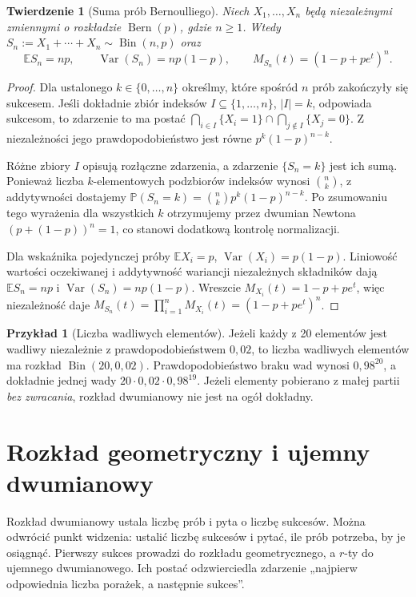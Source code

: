 \documentclass[11pt,a4paper,oneside]{report}
\numberwithin{equation}{chapter}
\theoremstyle{plain}
\newtheorem{twierdzenie}{Twierdzenie}[chapter]
\theoremstyle{definition}
\newtheorem{przyklad}{Przykład}[chapter]
\theoremstyle{remark}
\newcommand{\Prob}{\mathbb{P}}
\newcommand{\E}{\mathbb{E}}
\newcommand{\Var}{\operatorname{Var}}
\newcommand{\Bin}{\operatorname{Bin}}
\begin{document}
\begin{twierdzenie}[Suma prób Bernoulliego]
Niech $X_1,\ldots,X_n$ będą niezależnymi zmiennymi o rozkładzie
$\operatorname{Bern}(p)$, gdzie $n\geq1$. Wtedy
$S_n:=X_1+\cdots+X_n\sim\Bin(n,p)$ oraz
\[
\E S_n=np,\qquad \Var(S_n)=np(1-p),\qquad
M_{S_n}(t)=(1-p+pe^t)^n.
\]
\end{twierdzenie}
\begin{proof}
Dla ustalonego $k\in\{0,\ldots,n\}$ określmy,
które spośród $n$ prób zakończyły się sukcesem.
Jeśli dokładnie zbiór indeksów $I\subseteq\{1,\ldots,n\}$,
$|I|=k$, odpowiada sukcesom, to zdarzenie to ma postać
$\bigcap_{i\in I}\{X_i=1\}\cap
\bigcap_{j\notin I}\{X_j=0\}$.
Z niezależności jego prawdopodobieństwo jest równe
$p^k(1-p)^{n-k}$.

Różne zbiory $I$ opisują rozłączne zdarzenia,
a zdarzenie $\{S_n=k\}$ jest ich sumą. Ponieważ
liczba $k$-elementowych podzbiorów indeksów wynosi
$\binom nk$, z addytywności dostajemy
$\Prob(S_n=k)=\binom nk p^k(1-p)^{n-k}$.
Po zsumowaniu tego wyrażenia dla wszystkich $k$
otrzymujemy przez dwumian Newtona
$(p+(1-p))^n=1$, co stanowi dodatkową kontrolę normalizacji.

Dla wskaźnika pojedynczej próby
$\E X_i=p$, $\Var(X_i)=p(1-p)$.
Liniowość wartości oczekiwanej i addytywność
wariancji niezależnych składników dają
$\E S_n=np$ i $\Var(S_n)=np(1-p)$.
Wreszcie $M_{X_i}(t)=1-p+pe^t$, więc niezależność daje
$M_{S_n}(t)=\prod_{i=1}^nM_{X_i}(t)
=(1-p+pe^t)^n$.
\end{proof}

\begin{przyklad}[Liczba wadliwych elementów]
Jeżeli każdy z 20 elementów jest wadliwy niezależnie z
prawdopodobieństwem $0{,}02$, to liczba wadliwych elementów
ma rozkład $\Bin(20,0{,}02)$. Prawdopodobieństwo
braku wad wynosi $0{,}98^{20}$, a dokładnie jednej wady
$20\cdot0{,}02\cdot0{,}98^{19}$.
Jeżeli elementy pobierano z małej partii \emph{bez zwracania},
rozkład dwumianowy nie jest na ogół dokładny.
\end{przyklad}

\section{Rozkład geometryczny i ujemny dwumianowy}
Rozkład dwumianowy ustala liczbę prób i pyta o liczbę sukcesów.
Można odwrócić punkt widzenia: ustalić liczbę sukcesów i
pytać, ile prób potrzeba, by je osiągnąć. Pierwszy sukces
prowadzi do rozkładu geometrycznego, a $r$-ty do ujemnego
dwumianowego. Ich postać odzwierciedla zdarzenie
„najpierw odpowiednia liczba porażek, a następnie sukces”.
\end{document}
